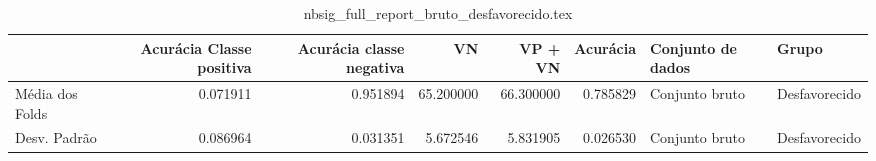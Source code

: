 \begin{table}
\centering
\caption{nbsig_full_report_bruto_desfavorecido.tex}
\label{nbsig_full_report_bruto_desfavorecido.tex}
\begin{tabular}{lrrrrrll}
\toprule
{}              &  Acurácia Classe positiva &  Acurácia classe negativa &        VN  &   VP + VN  &  Acurácia & Conjunto de dados &          Grupo \\
\midrule
Média dos Folds &                  0.071911 &                  0.951894 &  65.200000 &  66.300000 &  0.785829 &    Conjunto bruto &  Desfavorecido \\
Desv. Padrão    &                  0.086964 &                  0.031351 &   5.672546 &   5.831905 &  0.026530 &    Conjunto bruto &  Desfavorecido \\
\bottomrule
\end{tabular}
\end{table}
